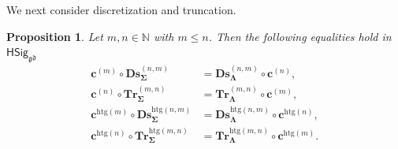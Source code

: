 \documentclass[a4paper, reqno]{amsbook}
\newcommand{\sig}[1]{\mathbf{#1}}             %
\newcommand{\gd}{\mathfrak{gd}}              %
\newcommand{\htg}{\mathrm{htg}}                %
\newcommand{\bDs}{\mathbf{Ds}}
\newcommand{\bTr}{\mathbf{Tr}}
\theoremstyle{plain}
\newtheorem{proposition}[theorem]{Proposition}
\theoremstyle{definition}
\begin{document}
We next consider discretization and truncation.

\begin{proposition}\label{PChangeSigDsTr}
Let $m,n\in\mathbb{N}$ with $m\leq n$.
Then the following equalities hold in $\mathsf{HSig}_{\gd}$
\begin{align*}
\mathbf{c}^{(m)}\circ\bDs^{(n,m)}_{\sig{\Sigma}}&=\bDs^{(n,m)}_{\sig{\Lambda}}\circ\mathbf{c}^{(n)},
\\
\mathbf{c}^{(n)}\circ\bTr^{(m,n)}_{\sig{\Sigma}}&=\bTr^{(m,n)}_{\sig{\Lambda}}\circ\mathbf{c}^{(m)},
\\
\mathbf{c}^{\htg(m)}\circ\bDs^{\htg(n,m)}_{\sig{\Sigma}}&=\bDs^{\htg(n,m)}_{\sig{\Lambda}}\circ\mathbf{c}^{\htg(n)},
\\
\mathbf{c}^{\htg(n)}\circ\bTr^{\htg(m,n)}_{\sig{\Sigma}}&=\bTr^{\htg(m,n)}_{\sig{\Lambda}}\circ\mathbf{c}^{\htg(m)}.
\end{align*}
\end{proposition}
\end{document}
